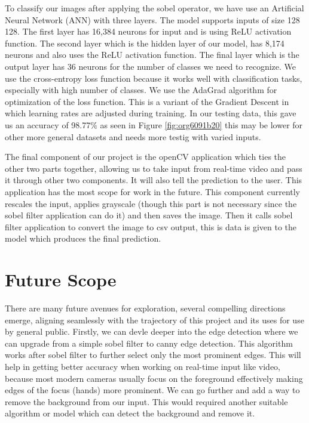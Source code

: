 \documentclass[a4paper,oneside,12pt]{report}
\begin{document}
To classify our images after applying the sobel operator, we have use an Artificial Neural Network (ANN) with three layers. The model supports inputs of size 128 \texttimes{} 128. The first layer has 16,384 neurons for input and is using ReLU activation function. The second layer which is the hidden layer of our model, has 8,174 neurons and also uses the ReLU activation function. The final layer which is the output layer has 36 neurons for the number of classes we need to recognize. We use the cross-entropy loss function because it works well with classification tasks, especially with high number of classes. We use the AdaGrad algorithm for optimization of the loss function. This is a variant of the Gradient Descent in which learning rates are adjusted during training. In our testing data, this gave us an accuracy of 98.77\%  as seen in Figure \ref{fig:org6091b20} this may be lower for other more general datasets and needs more testig with varied inputs.

The final component of our project is the openCV application which ties the other two parts together, allowing us to take input from real-time video and pass it through other two components. It will also tell the prediction to the user. This application has the most scope for work in the future. This component currently rescales the input, applies grayscale (though this part is not necessary since the sobel filter application can do it) and then saves the image. Then it calls sobel filter application to convert the image to csv output, this is data is given to the model which produces the final prediction.

\chapter{Future Scope}
\label{sec:orge515fae}
There are many future avenues for exploration, several compelling directions emerge, aligning seamlessly with the trajectory of this project and its uses for use by general public. Firstly, we can devle deeper into the edge detection where we can upgrade from a simple sobel filter to canny edge detection. This algorithm works after sobel filter to further select only the most prominent edges. This will help in getting better accuracy when working on real-time input like video, because most modern cameras usually focus on the foreground effectively making edges of the focus (hands) more prominent. We can go further and add a way to remove the background from our input. This would required another suitable algorithm or model which can detect the background and remove it.
\end{document}
